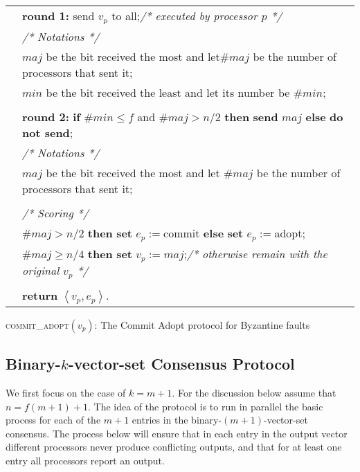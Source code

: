 \documentclass[11pt]{article}
\newcommand{\tri}[1]{\left<#1 \right>}
\newcommand{\tb}{\makebox[0.6cm]{}}
\newcommand{\due}{\makebox[1cm]{}}
\newcommand{\ca}{{\small\textsc{commit\!\_adopt}}\xspace}
\begin{document}
\begin{algorithm}[!ht]
\footnotesize
{}
 \setcounter{AlgoLine}{0}
\begin{tabular}{ r l }
\lnl{line:vote1} &  {\bf round 1:}   send $v_p$ to all;\hspace{2.2in}\hfill\textit{/* executed by processor $p$ */}\\
\nl & \tb\due \textit{/* Notations */}\\
\lnl{line:1st}& \tb\due {\bf let} $maj$ be the bit received the most and let$\#maj$ be the number of processors that sent it;\\
\nl & \tb\due {\bf let} $min$ be the bit received the least and let its number be $\#min$;\\
\\
\lnl{line:test}&  {\bf round 2:}  {\bf if} $\#min \leq f$ and $\#maj> n/2 $ {\bf then} {\bf send}  $maj$  {\bf else} {\bf do not send};\\
\nl & \tb\due \textit{/* Notations */}\\
\nl & \tb\due {\bf let} $maj$ be the bit received the most and let $\#maj$ be the number of processors that sent it;\\
\\
\nl &  \textit{/* Scoring */}\\
\lnl{line:commit}& \tb {\bf if}  $\#maj> n/2 $ {\bf then} {\bf set}  $e_p := ${\sc commit}  {\bf else} {\bf set}  $e_p := ${\sc adopt};\\
\lnl{line:value}& \tb {\bf if} $\#maj \geq n/4$ {\bf then} {\bf set}  $v_p :=maj$;\hfill\textit{/* otherwise remain with the original $v_p$ */}\\
\\
\nl & {\bf return} $\tri{v_p,e_p}$.
\end{tabular}
 \caption{ \ca\!$(v_p)$: The Commit Adopt protocol for Byzantine faults}\label{figure:ca}
\end{algorithm}



\subsection{Binary-$k$-vector-set Consensus Protocol}



We first focus on the case of $k=m+1.$  For the discussion below assume that $n=f(m+1)+1.$ 
The idea of the protocol is to run in parallel the basic process for each of the $m+1$ entries in the binary-$(m+1)$-vector-set consensus.  The process below will ensure that in each entry in the output vector different processors never produce conflicting outputs, and that for at least one entry all processors report an output.
\end{document}
